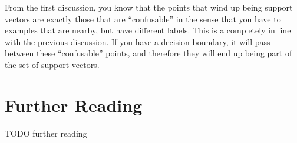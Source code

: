 From the first discussion, you know that the points that wind up being
support vectors are exactly those that are ``confusable'' in the sense
that you have to examples that are nearby, but have different labels.
This is a completely in line with the previous discussion.  If you
have a decision boundary, it will pass between these ``confusable''
points, and therefore they will end up being part of the set of
support vectors.

\begin{comment}
\section{Kernelized Regression}

Now, consider another example: linear regression (from
Section~\ref{sec:loss:reg}).  This was a linear model, under which $y
= \dotp{\vw}{\vx}+b$ and where the optimal weights are given in closed
form by:
%
\begin{align}
  \textcolor{darkred}{\vw} &= \textcolor{darkblue}{\left( \mat X \T \mat X + \la \eye_D \right)}\inv \textcolor{darkergreen}{\mat X \T \vec Y}
\end{align}
%
where $\mat X$ is the $N\times D$ data matrix, $\la$ is a
regularization parameter and $\vec Y$ is the $N\times 1$ vector of
labels.

This algorithm is, in some ways, even easier to kernelize than the
perceptron.  The optimal solution has a closed form, and 
\end{comment}

\section{Further Reading}

TODO further reading






